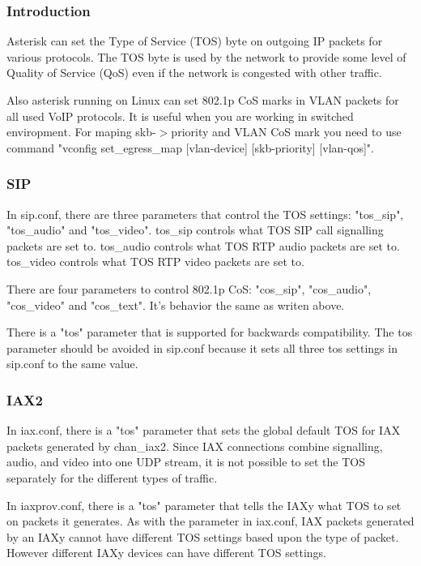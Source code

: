 \subsubsection{Introduction}

Asterisk can set the Type of Service (TOS) byte on outgoing IP packets
for various protocols.  The TOS byte is used by the network to provide
some level of Quality of Service (QoS) even if the network is
congested with other traffic. 

Also asterisk running on Linux can set 802.1p CoS marks in VLAN packets 
for all used VoIP protocols. It is useful when you are working in switched 
enviropment. For maping skb-$>$priority and VLAN CoS mark you need to use 
command "vconfig set\_egress\_map [vlan-device] [skb-priority] [vlan-qos]".

\subsubsection{SIP}

In sip.conf, there are three parameters that control the TOS settings:
"tos\_sip", "tos\_audio" and "tos\_video". tos\_sip controls what TOS SIP 
call signalling packets are set to.  tos\_audio controls what TOS RTP audio
packets are set to.  tos\_video controls what TOS RTP video packets are
set to.  

There are four parameters to control 802.1p CoS: "cos\_sip", "cos\_audio", 
"cos\_video" and "cos\_text". It's behavior the same as writen above.

There is a "tos" parameter that is supported for backwards
compatibility.  The tos parameter should be avoided in sip.conf
because it sets all three tos settings in sip.conf to the same value.

\subsubsection{IAX2}
In iax.conf, there is a "tos" parameter that sets the global default TOS
for IAX packets generated by chan\_iax2.  Since IAX connections combine
signalling, audio, and video into one UDP stream, it is not possible
to set the TOS separately for the different types of traffic.

In iaxprov.conf, there is a "tos" parameter that tells the IAXy what TOS
to set on packets it generates.  As with the parameter in iax.conf,
IAX packets generated by an IAXy cannot have different TOS settings
based upon the type of packet.  However different IAXy devices can
have different TOS settings.

